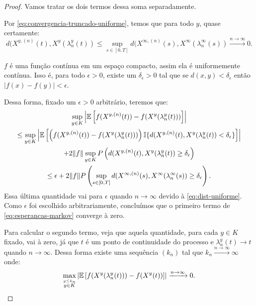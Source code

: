 \begin{proof}
  Vamos tratar os dois termos dessa soma separadamente.

  Por \eqref{eq:convergencia-truncado-uniforme}, temos que para todo
  $y$, quase certamente:
  \begin{equation}
    \label{eq:dist-uniforme}
    d(X^{y, (n)}(t), X^y(\lambda_n^y(t)) \leq
    \sup_{s \in [0, T]} d(X^{\infty, (n)}(s), X^\infty(\lambda_n^\infty(s))
    \xrightarrow{n\to\infty} 0.
  \end{equation}
  
  $f$ é uma função contínua em um espaço compacto, assim ela é
  uniformemente contínua. Isso é, para todo $\epsilon > 0$, existe um
  $\delta_\epsilon > 0$ tal que se $d(x, y) < \delta_\epsilon$ então
  $|f(x)-f(y)| < \epsilon$.

  Dessa forma, fixado um $\epsilon > 0$ arbitrário, teremos que:
  \begin{gather*}
    \sup_{y\in K} \left\lvert {\mathbb{E}} \left[ f(X^{y,(n)}(t)) -
        f(X^{y}(\lambda_n^y(t))) \right]
    \right\rvert\\
    \leq \sup_{y\in K} \left\lvert {\mathbb{E}} \left[ \left(f(X^{y,(n)}(t)) -
          f(X^{y}(\lambda_n^y(t))) \right) {\mathbb{I}}\{ d(X^{y, (n)}(t),
        X^y(\lambda_n^y(t)) < \delta_\epsilon \} \right]
    \right\rvert \\
    + 2\Vert f \Vert \sup_{y \in K} P\left( d(X^{y, (n)}(t),
      X^y(\lambda_n^y(t)) \geq
      \delta_\epsilon \right) \\
    \leq \epsilon + 2 \Vert f \Vert P \left( \sup_{s \in [0,
        T]}d(X^{\infty, (n)}(s), X^\infty(\lambda_n^\infty(s)) \geq
      \delta_\epsilon \right).
  \end{gather*}
  Essa última quantidade vai para $\epsilon$ quando $n\to \infty$
  devido à \eqref{eq:dist-uniforme}. Como $\epsilon$ foi escolhido
  arbitrariamente, concluímos que o primeiro termo de
  \eqref{eq:esperancas-markov} converge à zero.

  Para calcular o segundo termo, veja que aquela quantidade, para cada
  $y \in K$ fixado, vai à zero, já que $t$ é \qc um ponto de
  continuidade do processo e $\lambda_n^y(t) \to t$ quando
  $n\to\infty$. Dessa forma existe uma sequência $(k_n)$ tal que $k_n
  \xrightarrow{n\to\infty} \infty$ onde:
  \begin{displaymath}
      \max_{\stackrel{y \leq k_n}{y\in K}} \left\lvert
      {\mathbb{E}} \left[f(X^y(\lambda_n^y(t))) - f(X^y(t)) \right]
    \right\rvert \xrightarrow{n\to \infty} 0.
  \end{displaymath}


\end{proof}
